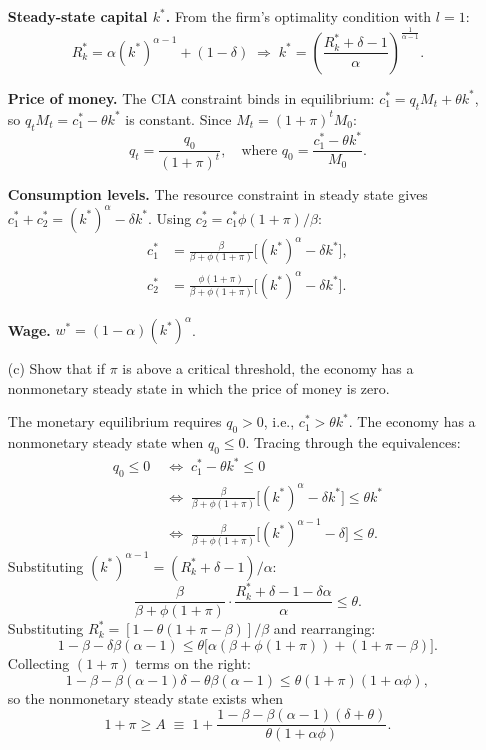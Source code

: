\documentclass[11pt,english]{article}
\begin{document}
\begin{enumerate}
\begin{solution}
\medskip
\noindent\textbf{Steady-state capital $k^*$.} From the firm's optimality
condition with $l = 1$:
\[
    R_k^* = \alpha(k^*)^{\alpha-1} + (1-\delta)
    \;\Rightarrow\;
    \boxed{k^* = \left(\frac{R_k^* + \delta - 1}{\alpha}\right)^{\!\frac{1}{\alpha-1}}.}
\]
 
\medskip
\noindent\textbf{Price of money.} The CIA constraint binds in equilibrium:
$c_1^* = q_t M_t + \theta k^*$, so $q_t M_t = c_1^* - \theta k^*$ is
constant. Since $M_t = (1+\pi)^t M_0$:
\[
    \boxed{q_t = \frac{q_0}{(1+\pi)^t},\quad \text{where } q_0 = \frac{c_1^* - \theta k^*}{M_0}.}
\]
 
\medskip
\noindent\textbf{Consumption levels.} The resource constraint in steady state
gives $c_1^* + c_2^* = (k^*)^\alpha - \delta k^*$. Using $c_2^* = c_1^*
\phi(1+\pi)/\beta$:
\begin{align*}
    c_1^* &= \frac{\beta}{\beta + \phi(1+\pi)}\bigl[(k^*)^\alpha - \delta k^*\bigr], \\[4pt]
    c_2^* &= \frac{\phi(1+\pi)}{\beta + \phi(1+\pi)}\bigl[(k^*)^\alpha - \delta k^*\bigr].
\end{align*}
 
\medskip
\noindent\textbf{Wage.} $w^* = (1-\alpha)(k^*)^\alpha$.
\end{solution}
 
\item[(c)] Show that if $\pi$ is above a critical threshold, the economy has a
    nonmonetary steady state in which the price of money is zero.
\begin{solution}
The monetary equilibrium requires $q_0 > 0$, i.e., $c_1^* > \theta k^*$. The
economy has a nonmonetary steady state when $q_0 \leq 0$. Tracing through the
equivalences:
\begin{align*}
    q_0 \leq 0
    &\;\Leftrightarrow\; c_1^* - \theta k^* \leq 0 \\
    &\;\Leftrightarrow\; \frac{\beta}{\beta+\phi(1+\pi)}\bigl[(k^*)^\alpha - \delta k^*\bigr]
        \leq \theta k^* \\
    &\;\Leftrightarrow\; \frac{\beta}{\beta+\phi(1+\pi)}\bigl[(k^*)^{\alpha-1} - \delta\bigr]
        \leq \theta.
\end{align*}
Substituting $(k^*)^{\alpha-1} = (R_k^*+\delta-1)/\alpha$:
\[
    \frac{\beta}{\beta+\phi(1+\pi)}
    \cdot\frac{R_k^*+\delta-1-\delta\alpha}{\alpha}
    \leq \theta.
\]
Substituting $R_k^* = [1-\theta(1+\pi-\beta)]/\beta$ and rearranging:
\[
    1-\beta-\delta\beta(\alpha-1)
    \leq \theta\bigl[\alpha(\beta+\phi(1+\pi)) + (1+\pi-\beta)\bigr].
\]
Collecting $(1+\pi)$ terms on the right:
\[
    1 - \beta - \beta(\alpha-1)\delta - \theta\beta(\alpha-1)
    \leq \theta(1+\pi)(1+\alpha\phi),
\]
so the nonmonetary steady state exists when
\[
    1 + \pi \geq A \;\equiv\; 1 +
    \frac{1-\beta-\beta(\alpha-1)(\delta+\theta)}{\theta(1+\alpha\phi)}.
\]
\end{solution}
 

\end{enumerate}
\end{document}
